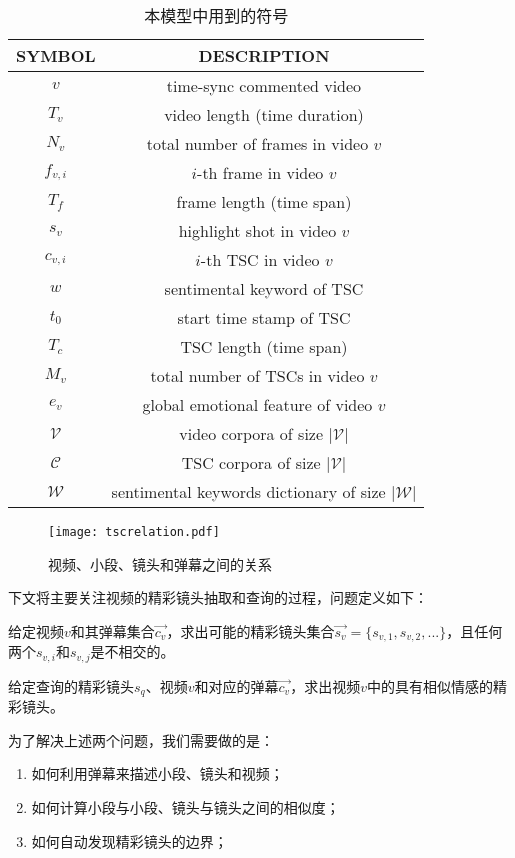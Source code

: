 \begin{table}
\caption{本模型中用到的符号}
\centering
\begin{tabular}{c c} 
\hline
SYMBOL & DESCRIPTION \\ 
\hline
$v$ & time-sync commented video \\
$T_v$ & video length (time duration) \\
$N_v$ & total number of frames in video $v$ \\
$f_{v,i}$ & $i$-th frame in video $v$ \\
$T_f$ & frame length (time span) \\
$s_v$ & highlight shot in video $v$ \\
$c_{v,i}$ & $i$-th TSC in video $v$ \\
$w$ & sentimental keyword of TSC \\
$t_0$ & start time stamp of TSC \\
$T_c$ & TSC length (time span) \\
$M_v$ & total number of TSCs in video $v$ \\
$e_v$ & global emotional feature of video $v$ \\
$\mathcal{V}$ & video corpora of size $|\mathcal{V}|$ \\
$\mathcal{C}$ & TSC corpora of size $|\mathcal{V}|$ \\
$\mathcal{W}$ & sentimental keywords dictionary of size $|\mathcal{W}|$\\
\hline
\end{tabular}
\label{tbl:notation}
\end{table}

\begin{figure}
\centering
\texttt{[image: tscrelation.pdf]}
\caption{视频、小段、镜头和弹幕之间的关系}
\label{fig:tscrelation}
\end{figure}

下文将主要关注视频的精彩镜头抽取和查询的过程，问题定义如下：
\begin{mydef}[视频精彩镜头的抽取问题]
  给定视频$v$和其弹幕集合$\vec{c_v}$，求出可能的精彩镜头集合$\vec{s_v}=\{s_{v,1}, s_{v,2},...\}$，且任何两个$s_{v,i}$和$s_{v,j}$是不相交的。
\end{mydef}
\begin{mydef}[视频精彩镜头的查询问题] 
  给定查询的精彩镜头$s_q$、视频$v$和对应的弹幕$\vec{c_v}$，求出视频$v$中的具有相似情感的精彩镜头。
\end{mydef}
为了解决上述两个问题，我们需要做的是：
\begin{enumerate}
  \item 如何利用弹幕来描述小段、镜头和视频；
  \item 如何计算小段与小段、镜头与镜头之间的相似度；
  \item 如何自动发现精彩镜头的边界；
\end{enumerate}

